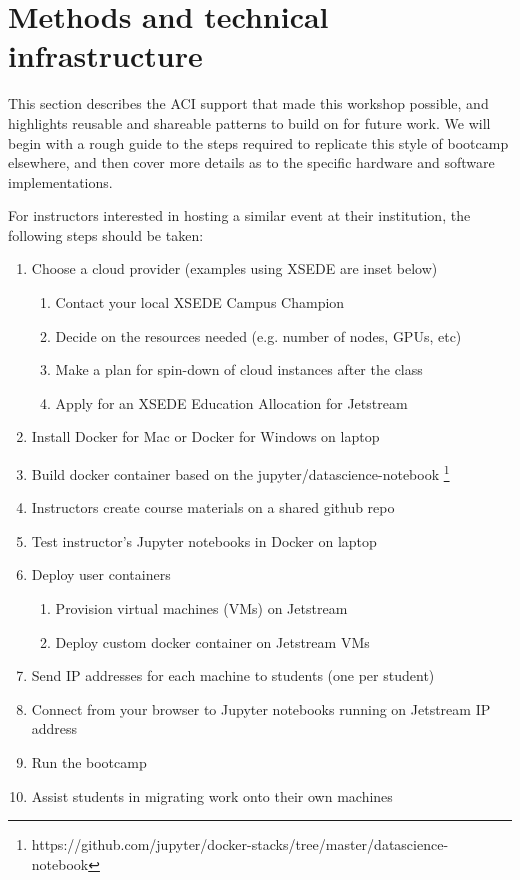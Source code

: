 \section{Methods and technical infrastructure}\label{sec:methods}

This section describes the ACI support that made this workshop possible, and
highlights reusable and shareable patterns to build on for future work. We will
begin with a rough guide to the steps required to replicate this style of
bootcamp elsewhere, and then cover more details as to the specific hardware and
software implementations.

For instructors interested in hosting a similar event at their institution, the
following steps should be taken:

\begin{enumerate}
\item Choose a cloud provider (examples using XSEDE are inset below)
  \begin{enumerate}
    \item Contact your local XSEDE Campus Champion
    \item Decide on the resources needed (e.g. number of nodes, GPUs, etc)
    \item Make a plan for spin-down of cloud instances after the class
    \item Apply for an XSEDE Education Allocation for Jetstream
  \end{enumerate}

\item Install Docker for Mac or Docker for Windows on laptop
\item Build docker container based on the jupyter/datascience-notebook \footnote{https://github.com/jupyter/docker-stacks/tree/master/datascience-notebook}
\item Instructors create course materials on a shared github repo
\item Test instructor's Jupyter notebooks in Docker on laptop
\item Deploy user containers
  \begin{enumerate}
  \item Provision virtual machines (VMs) on Jetstream
  \item Deploy custom docker container on Jetstream VMs
  \end{enumerate}
\item Send IP addresses for each machine to students (one per student)
\item Connect from your browser to Jupyter notebooks running on Jetstream IP address
\item Run the bootcamp
\item Assist students in migrating work onto their own machines
\end{enumerate}

